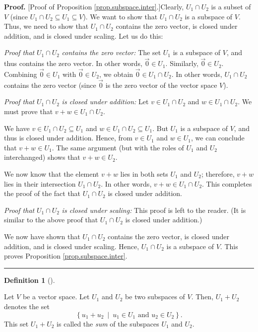\documentclass[numbers=enddot,12pt,final,onecolumn,notitlepage]{scrartcl}%
\theoremstyle{definition}
\newtheorem{defi}[theo]{Definition}
\newenvironment{definition}[1][]
{\begin{defi}[#1]\begin{leftbar}}
{\end{leftbar}\end{defi}}
\newenvironment{proof}[1][Proof]{\noindent\textbf{#1.} }{\ \rule{0.5em}{0.5em}}
\begin{document}
\begin{proof}
[Proof of Proposition \ref{prop.subspace.inter}.]Clearly, $U_{1}\cap U_{2}$ is
a subset of $V$ (since $U_{1}\cap U_{2}\subseteq U_{1}\subseteq V$). We want
to show that $U_{1}\cap U_{2}$ is a subspace of $V$. Thus, we need to show
that $U_{1}\cap U_{2}$ contains the zero vector, is closed under addition, and
is closed under scaling. Let us do this:

\textit{Proof that }$U_{1}\cap U_{2}$\textit{ contains the zero vector:} The
set $U_{1}$ is a subspace of $V$, and thus contains the zero vector. In other
words, $\overrightarrow{0}\in U_{1}$. Similarly, $\overrightarrow{0}\in U_{2}%
$. Combining $\overrightarrow{0}\in U_{1}$ with $\overrightarrow{0}\in U_{2}$,
we obtain $\overrightarrow{0}\in U_{1}\cap U_{2}$. In other words, $U_{1}\cap
U_{2}$ contains the zero vector (since $\overrightarrow{0}$ is the zero vector
of the vector space $V$).

\textit{Proof that }$U_{1}\cap U_{2}$ \textit{is closed under addition:} Let
$v\in U_{1}\cap U_{2}$ and $w\in U_{1}\cap U_{2}$. We must prove that $v+w\in
U_{1}\cap U_{2}$.

We have $v\in U_{1}\cap U_{2}\subseteq U_{1}$ and $w\in U_{1}\cap
U_{2}\subseteq U_{1}$. But $U_{1}$ is a subspace of $V$, and thus is closed
under addition. Hence, from $v\in U_{1}$ and $w\in U_{1}$, we can conclude
that $v+w\in U_{1}$. The same argument (but with the roles of $U_{1}$ and
$U_{2}$ interchanged) shows that $v+w\in U_{2}$.

We now know that the element $v+w$ lies in both sets $U_{1}$ and $U_{2}$;
therefore, $v+w$ lies in their intersection $U_{1}\cap U_{2}$. In other words,
$v+w\in U_{1}\cap U_{2}$. This completes the proof of the fact that $U_{1}\cap
U_{2}$ is closed under addition.

\textit{Proof that }$U_{1}\cap U_{2}$ \textit{is closed under scaling:} This
proof is left to the reader. (It is similar to the above proof that $U_{1}\cap
U_{2}$ is closed under addition.)

We now have shown that $U_{1}\cap U_{2}$ contains the zero vector, is closed
under addition, and is closed under scaling. Hence, $U_{1}\cap U_{2}$ is a
subspace of $V$. This proves Proposition \ref{prop.subspace.inter}.
\end{proof}

\begin{definition}
\label{def.subspace.sum}Let $V$ be a vector space. Let $U_{1}$ and $U_{2}$ be
two subspaces of $V$. Then, $U_{1}+U_{2}$ denotes the set%
\[
\left\{  u_{1}+u_{2}\ \mid\ u_{1}\in U_{1}\text{ and }u_{2}\in U_{2}\right\}
.
\]
This set $U_{1}+U_{2}$ is called the \textit{sum} of the subspaces $U_{1}$ and
$U_{2}$.
\end{definition}
\end{document}
